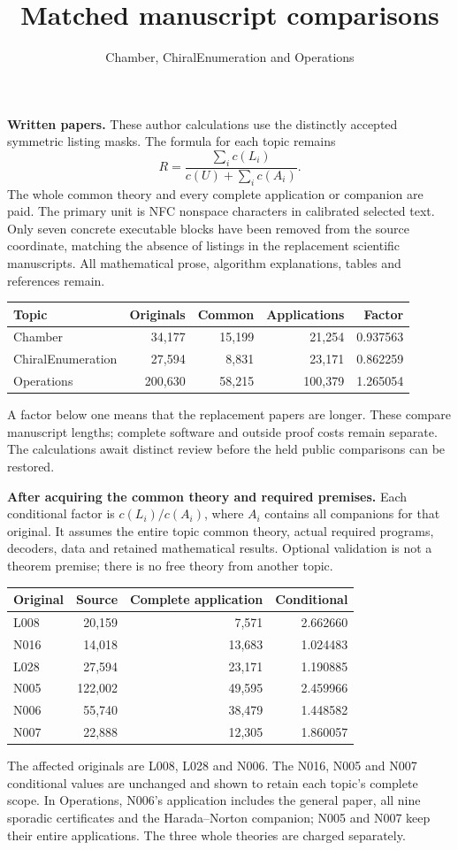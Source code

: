 \documentclass[11pt,a4paper]{article}
\title{Matched manuscript comparisons}\author{Chamber, ChiralEnumeration and Operations}\date{}
\begin{document}
\maketitle
\textbf{Written papers.} These author calculations use the distinctly accepted symmetric listing masks. The formula for each topic remains
\[
 R=\frac{\sum_i c(L_i)}{c(U)+\sum_i c(A_i)}.
\]
The whole common theory and every complete application or companion are paid. The primary unit is NFC nonspace characters in calibrated selected text. Only seven concrete executable blocks have been removed from the source coordinate, matching the absence of listings in the replacement scientific manuscripts. All mathematical prose, algorithm explanations, tables and references remain.
\begin{center}\begin{tabular}{lrrrr}\toprule
Topic & Originals & Common & Applications & Factor\\\midrule
Chamber & 34,177 & 15,199 & 21,254 & 0.937563\\
ChiralEnumeration & 27,594 & 8,831 & 23,171 & 0.862259\\
Operations & 200,630 & 58,215 & 100,379 & 1.265054\\
\bottomrule\end{tabular}\end{center}
A factor below one means that the replacement papers are longer. These compare manuscript lengths; complete software and outside proof costs remain separate. The calculations await distinct review before the held public comparisons can be restored.

\textbf{After acquiring the common theory and required premises.} Each conditional factor is $c(L_i)/c(A_i)$, where $A_i$ contains all companions for that original. It assumes the entire topic common theory, actual required programs, decoders, data and retained mathematical results. Optional validation is not a theorem premise; there is no free theory from another topic.
\begin{center}\begin{tabular}{lrrr}\toprule
Original & Source & Complete application & Conditional\\\midrule
L008 & 20,159 & 7,571 & 2.662660\\
N016 & 14,018 & 13,683 & 1.024483\\
L028 & 27,594 & 23,171 & 1.190885\\
N005 & 122,002 & 49,595 & 2.459966\\
N006 & 55,740 & 38,479 & 1.448582\\
N007 & 22,888 & 12,305 & 1.860057\\
\bottomrule\end{tabular}\end{center}
The affected originals are L008, L028 and N006. The N016, N005 and N007 conditional values are unchanged and shown to retain each topic's complete scope. In Operations, N006's application includes the general paper, all nine sporadic certificates and the Harada--Norton companion; N005 and N007 keep their entire applications. The three whole theories are charged separately.
\end{document}
